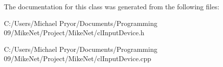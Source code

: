 The documentation for this class was generated from the following files:\begin{DoxyCompactItemize}
\item 
C:/Users/Michael Pryor/Documents/Programming 09/MikeNet/Project/MikeNet/clInputDevice.h\item 
C:/Users/Michael Pryor/Documents/Programming 09/MikeNet/Project/MikeNet/clInputDevice.cpp\end{DoxyCompactItemize}
